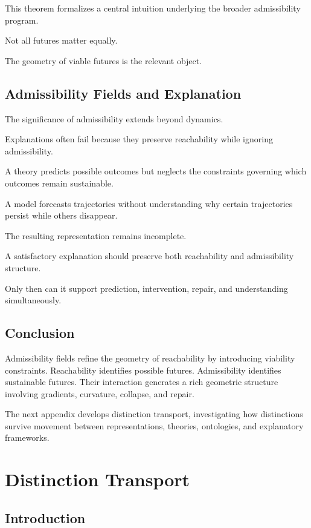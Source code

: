 \documentclass[11pt,oneside,openany]{book}
\begin{document}
This theorem formalizes a central intuition underlying the broader admissibility program.

Not all futures matter equally.

The geometry of viable futures is the relevant object.

\section{Admissibility Fields and Explanation}

The significance of admissibility extends beyond dynamics.

Explanations often fail because they preserve reachability while ignoring admissibility.

A theory predicts possible outcomes but neglects the constraints governing which outcomes remain sustainable.

A model forecasts trajectories without understanding why certain trajectories persist while others disappear.

The resulting representation remains incomplete.

A satisfactory explanation should preserve both reachability and admissibility structure.

Only then can it support prediction, intervention, repair, and understanding simultaneously.

\section{Conclusion}

Admissibility fields refine the geometry of reachability by introducing viability constraints. Reachability identifies possible futures. Admissibility identifies sustainable futures. Their interaction generates a rich geometric structure involving gradients, curvature, collapse, and repair.

The next appendix develops distinction transport, investigating how distinctions survive movement between representations, theories, ontologies, and explanatory frameworks.

\chapter{Distinction Transport}

\section{Introduction}
\end{document}
